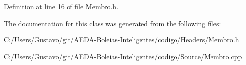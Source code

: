 Definition at line 16 of file Membro.\+h.



The documentation for this class was generated from the following files\+:\begin{DoxyCompactItemize}
\item 
C\+:/\+Users/\+Gustavo/git/\+A\+E\+D\+A-\/\+Boleias-\/\+Inteligentes/codigo/\+Headers/\hyperlink{_membro_8h}{Membro.\+h}\item 
C\+:/\+Users/\+Gustavo/git/\+A\+E\+D\+A-\/\+Boleias-\/\+Inteligentes/codigo/\+Source/\hyperlink{_membro_8cpp}{Membro.\+cpp}\end{DoxyCompactItemize}
